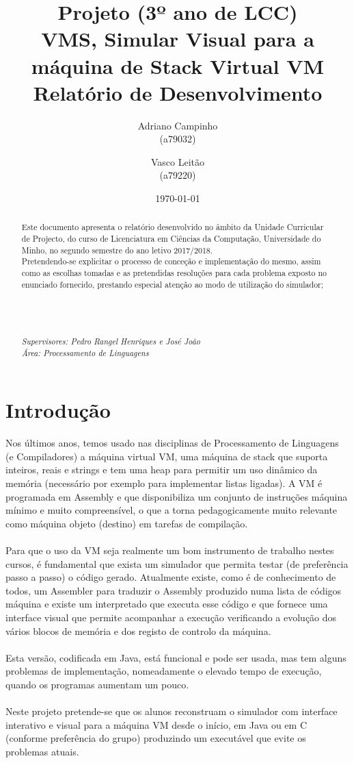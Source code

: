 \documentclass{report}
\title{Projeto (3º ano de LCC)\\ \textbf{VMS, Simular Visual para a máquina de Stack Virtual VM}\\ Relatório de Desenvolvimento}
\author{Adriano Campinho\\ (a79032) \and Vasco Leitão\\ (a79220) }
\date{\today}
\def\supers#1{{\em Supervisores: #1}\\ }
\def\area#1{{\em \'{A}rea: #1}\\[0.2cm]}
\begin{document}
\maketitle
\begin{abstract}
	\quad Este documento apresenta o relatório desenvolvido no âmbito da Unidade Curricular de Projecto, do curso de
	Licenciatura em Ciências da Computação, Universidade do Minho, no segundo semestre do ano letivo 2017/2018.\\
	\quad Pretendendo-se explicitar o processo de conceção e implementação do mesmo, assim como as escolhas tomadas e as pretendidas resoluções
	para cada problema exposto no enunciado fornecido, prestando especial atenção ao modo de utilização do simulador; \\
	\\
	\\
	\\
    \\
	\supers{Pedro Rangel Henriques e José João}
	\area{Processamento de Linguagens}

\end{abstract}

\tableofcontents

\chapter{Introdução} \label{intro}

\quad Nos últimos anos, temos usado nas disciplinas de Processamento de Linguagens (e
Compiladores) a máquina virtual VM, uma máquina de stack que suporta inteiros, reais e
strings e tem uma heap para permitir um uso dinâmico da memória (necessário por exemplo
para implementar listas ligadas). A VM é programada em Assembly e que disponibiliza um
conjunto de instruções máquina mínimo e muito compreensível, o que a torna
pedagogicamente muito relevante como máquina objeto (destino) em tarefas de compilação.
\\
\\
\null\quad Para que o uso da VM seja realmente um bom instrumento de trabalho nestes cursos, é
fundamental que exista um simulador que permita testar (de preferência passo a passo) o
código gerado. Atualmente existe, como é de conhecimento de todos, um Assembler para
traduzir o Assembly produzido numa lista de códigos máquina e existe um interpretado que
executa esse código e que fornece uma interface visual que permite acompanhar a execução
verificando a evolução dos vários blocos de memória e dos registo de controlo da máquina.
\\
\\
\null\quad Esta versão, codificada em Java, está funcional e pode ser usada, mas tem alguns problemas de
implementação, nomeadamente o elevado tempo de execução, quando os programas
aumentam um pouco.
\\
\\
\null\quad Neste projeto pretende-se que os alunos reconstruam o simulador com interface interativo e
visual para a máquina VM desde o início, em Java ou em C (conforme preferência do grupo)
produzindo um executável que evite os problemas atuais.
\end{document}
